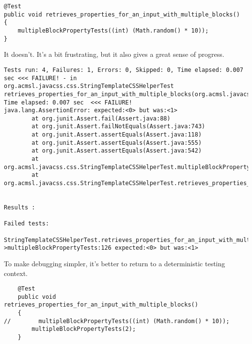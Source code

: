 \documentclass[11pt]{article}
\begin{document}
\begin{verbatim}
@Test
public void retrieves_properties_for_an_input_with_multiple_blocks()
{
    multipleBlockPropertyTests((int) (Math.random() * 10));
}
\end{verbatim}

It doesn't. It's a bit frustrating, but it also gives a great sense of progress.

\begin{verbatim}
Tests run: 4, Failures: 1, Errors: 0, Skipped: 0, Time elapsed: 0.007 sec <<< FAILURE! - in org.acmsl.javacss.css.StringTemplateCSSHelperTest
retrieves_properties_for_an_input_with_multiple_blocks(org.acmsl.javacss.css.StringTemplateCSSHelperTest)  Time elapsed: 0.007 sec  <<< FAILURE!
java.lang.AssertionError: expected:<0> but was:<1>
        at org.junit.Assert.fail(Assert.java:88)
        at org.junit.Assert.failNotEquals(Assert.java:743)
        at org.junit.Assert.assertEquals(Assert.java:118)
        at org.junit.Assert.assertEquals(Assert.java:555)
        at org.junit.Assert.assertEquals(Assert.java:542)
        at org.acmsl.javacss.css.StringTemplateCSSHelperTest.multipleBlockPropertyTests(StringTemplateCSSHelperTest.java:126)
        at org.acmsl.javacss.css.StringTemplateCSSHelperTest.retrieves_properties_for_an_input_with_multiple_blocks(StringTemplateCSSHelperTest.java:150)


Results :

Failed tests: 
  StringTemplateCSSHelperTest.retrieves_properties_for_an_input_with_multiple_blocks:150->multipleBlockPropertyTests:126 expected:<0> but was:<1>
\end{verbatim}

To make debugging simpler, it's better to return to a deterministic testing context.


\begin{verbatim}
    @Test
    public void retrieves_properties_for_an_input_with_multiple_blocks()
    {
//        multipleBlockPropertyTests((int) (Math.random() * 10));
        multipleBlockPropertyTests(2);
    }
\end{verbatim}
\end{document}
